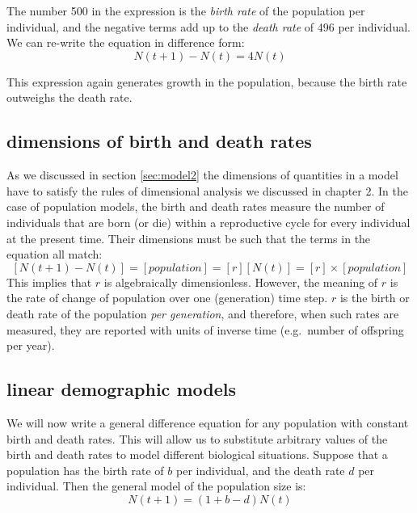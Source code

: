 \documentclass[
]{book}
\theoremstyle{definition}
\theoremstyle{definition}
\theoremstyle{definition}
\theoremstyle{remark}
\begin{document}
The number 500 in the expression is the  \emph{birth rate} of the population per individual, and the negative terms add up to the  \emph{death rate} of 496 per individual. We can re-write the equation in difference form:
\[ 
N(t+1) - N(t) = 4N(t)
\]

This expression again generates growth in the population, because the birth rate outweighs the death rate. \citep{allman_mathematical_2003}

\hypertarget{dimensions-of-birth-and-death-rates}{%
\subsection{dimensions of birth and death rates}\label{dimensions-of-birth-and-death-rates}}

As we discussed in section \ref{sec:model2} the dimensions of quantities in a model have to satisfy the rules of  dimensional analysis we discussed in chapter 2. In the case of population models, the birth and death rates measure the number of individuals that are born (or die) within a reproductive cycle for every individual at the present time. Their dimensions must be such that the terms in the equation all match:
\[ [N(t+1) - N(t)] = [population] = [r] [N(t)] = [r]  \times [population] \]
This implies that \(r\) is algebraically dimensionless. However, the meaning of \(r\) is the rate of change of population over one (generation) time step. \(r\) is the birth or death rate of the population \emph{per generation}, and therefore, when such rates are measured, they are reported with units of inverse time (e.g.~number of offspring per year).

\hypertarget{linear-demographic-models}{%
\subsection{linear demographic models}\label{linear-demographic-models}}

We will now write a general difference equation for any population with constant birth and death rates. This will allow us to substitute arbitrary values of the birth and death rates to model different biological situations. Suppose that a population has the birth rate of \(b\) per individual, and the death rate \(d\) per individual. Then the general model of the population size is:
\begin{equation}
 N(t+1) = (1 + b - d)N(t)
 \label{linear_pop}
\end{equation}
\end{document}
